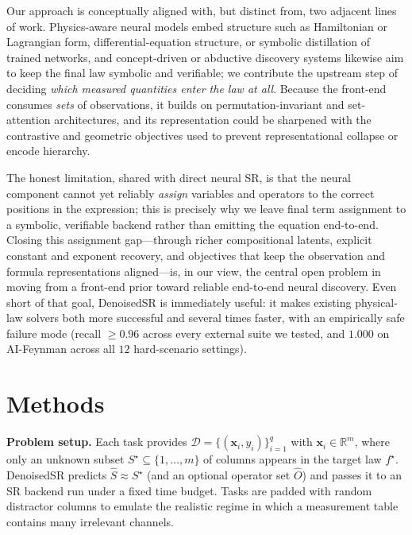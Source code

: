 \documentclass[11pt]{article}
\begin{document}
Our approach is conceptually aligned with, but distinct from, two adjacent lines of
work. Physics-aware neural models embed structure such as Hamiltonian or Lagrangian
form, differential-equation structure, or symbolic distillation of trained
networks\cite{greydanus2019hamiltonian,cranmer2020lagrangian,chen2018neuralode,%
cranmer2020discovering}, and concept-driven or abductive discovery
systems\cite{fang2025ainewton,srivastava2025ainoether,ying2025phye2e} likewise aim
to keep the final law symbolic and verifiable; we contribute the upstream step of
deciding \emph{which measured quantities enter the law at all}. Because the
front-end consumes \emph{sets} of observations, it builds on permutation-invariant
and set-attention architectures\cite{zaheer2017deepsets,lee2019settransformer}, and
its representation could be sharpened with the contrastive and geometric objectives
used to prevent representational collapse or encode
hierarchy\cite{bardes2022vicreg,nickel2017poincare,sinha2024hyperbolic}.

The honest limitation, shared with direct neural
SR\cite{kamienny2022endtoend,landajuela2022dso}, is that the neural component cannot
yet reliably \emph{assign} variables and operators to the correct positions in the
expression; this is precisely why we leave final term assignment to a symbolic,
verifiable backend rather than emitting the equation end-to-end. Closing this
assignment gap---through richer compositional latents, explicit constant and
exponent recovery, and objectives that keep the observation and formula
representations aligned\cite{meidani2024snip,rogers2025whatwedontc}---is, in our
view, the central open problem in moving from a front-end prior toward reliable
end-to-end neural discovery\cite{voigt2024ood,shojaee2025llmsr,hallin2024universal}.
Even short of that goal, DenoisedSR is immediately useful: it makes existing
physical-law solvers both more successful and several times faster, with an
empirically safe failure mode (recall $\ge 0.96$ across every external suite we
tested, and $1.000$ on AI-Feynman across all $12$ hard-scenario settings).

\section{Methods}

\noindent\textbf{Problem setup.} Each task provides
$\mathcal{D}=\{(\mathbf{x}_i,y_i)\}_{i=1}^q$ with $\mathbf{x}_i\in\mathbb{R}^{m}$,
where only an unknown subset $S^\star\subseteq\{1,\dots,m\}$ of columns appears in
the target law $f^\star$. DenoisedSR predicts $\hat S\approx S^\star$ (and an
optional operator set $\hat O$) and passes it to an SR backend run under a fixed
time budget. Tasks are padded with random distractor columns to emulate the
realistic regime in which a measurement table contains many irrelevant channels.
\end{document}
